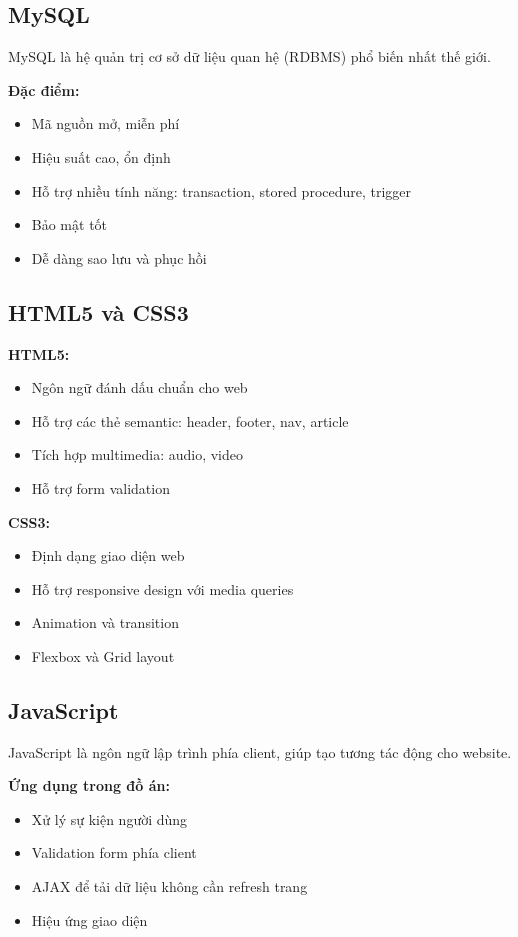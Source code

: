 \documentclass[12pt,a4paper]{report}
\begin{document}
\subsection{MySQL}

MySQL là hệ quản trị cơ sở dữ liệu quan hệ (RDBMS) phổ biến nhất thế giới.

\textbf{Đặc điểm:}
\begin{itemize}
    \item Mã nguồn mở, miễn phí
    \item Hiệu suất cao, ổn định
    \item Hỗ trợ nhiều tính năng: transaction, stored procedure, trigger
    \item Bảo mật tốt
    \item Dễ dàng sao lưu và phục hồi
\end{itemize}

\subsection{HTML5 và CSS3}

\textbf{HTML5:}
\begin{itemize}
    \item Ngôn ngữ đánh dấu chuẩn cho web
    \item Hỗ trợ các thẻ semantic: header, footer, nav, article
    \item Tích hợp multimedia: audio, video
    \item Hỗ trợ form validation
\end{itemize}

\textbf{CSS3:}
\begin{itemize}
    \item Định dạng giao diện web
    \item Hỗ trợ responsive design với media queries
    \item Animation và transition
    \item Flexbox và Grid layout
\end{itemize}

\subsection{JavaScript}

JavaScript là ngôn ngữ lập trình phía client, giúp tạo tương tác động cho website.

\textbf{Ứng dụng trong đồ án:}
\begin{itemize}
    \item Xử lý sự kiện người dùng
    \item Validation form phía client
    \item AJAX để tải dữ liệu không cần refresh trang
    \item Hiệu ứng giao diện
\end{itemize}
\end{document}
